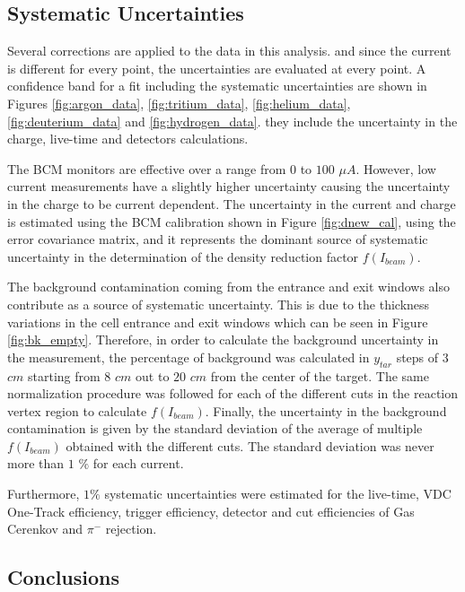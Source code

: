 \documentclass[final,5p,times,twocolumn]{elsarticle}
\begin{document}
\subsection{Systematic Uncertainties}

Several corrections are applied to the data in this analysis. and since the current is different for every point, the uncertainties are evaluated at every point.  A confidence band for a fit including the systematic uncertainties are shown in Figures  \ref{fig:argon_data}, \ref{fig:tritium_data}, \ref{fig:helium_data}, \ref{fig:deuterium_data} and \ref{fig:hydrogen_data}. they include the uncertainty in the charge, live-time and detectors calculations.

The BCM monitors are effective over a range from $0$ to $100$ $\mu A$. However, low current measurements have a slightly higher uncertainty causing the uncertainty in the charge to be current dependent. The uncertainty in the current and charge is estimated using the BCM calibration shown in Figure \ref{fig:dnew_cal}, using the error covariance matrix, and it represents the dominant source of systematic uncertainty in the determination of the density reduction factor $f(I_{beam})$.

The background contamination coming from the entrance and exit windows also contribute as a source of systematic uncertainty. This is due to the thickness variations in the cell entrance and exit windows which can be seen in Figure \ref{fig:bk_empty}. Therefore, in order to calculate the background uncertainty in the measurement, the percentage of background was calculated in $y_{tar}$ steps of $3$ $cm$ starting from $8$ $cm$ out to $20$ $cm$ from the center of the target.  The same normalization procedure was followed for each of the different cuts in the reaction vertex region to calculate $f(I_{beam})$. Finally, the uncertainty in the background contamination is given by the standard deviation of the average of multiple $f(I_{beam})$ obtained with the different cuts. The standard deviation was never more than $1$ $\% $ for each current.

Furthermore, $1\% $ systematic uncertainties were estimated for the live-time, VDC One-Track efficiency, trigger efficiency, detector and cut efficiencies of Gas Cerenkov and $\pi^{-}$ rejection.

\subsection {Conclusions }
\end{document}
